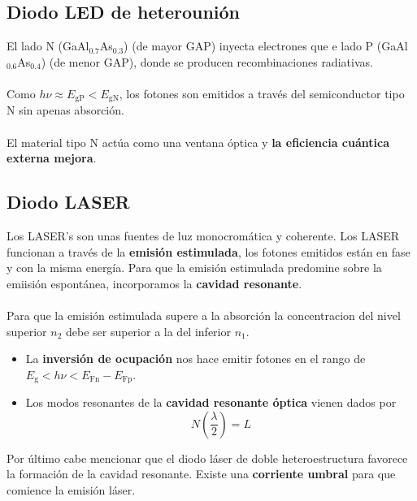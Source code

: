\subsection{Diodo LED de heterounión}
El lado N (GaAl$_{0.7}$As$_{0.3}$) (de mayor GAP) inyecta electrones que e lado P (GaAl$_{0.6}$As$_{0.4}$) (de menor GAP), donde se producen recombinaciones radiativas.\\\\
Como $h\nu \approx E_\mathrm{gP}<E_\mathrm{gN}$, los fotones son emitidos a través del semiconductor tipo N sin apenas absorción.\\\\
El material tipo N actúa como una ventana óptica y \textbf{la eficiencia cuántica externa mejora}.
\subsection{Diodo LASER}
Los LASER's son unas fuentes de luz monocromática y coherente. Los LASER funcionan a través de la \textbf{emisión estimulada}, los fotones emitidos están en fase y con la misma energía. Para que la emisión estimulada predomine sobre la emiisión espontánea, incorporamos la \textbf{cavidad resonante}.\\\\ Para que la emisión estimulada supere a la absorción la concentracion del nivel superior $n_2$ debe ser superior a la del inferior $n_1$.
\begin{itemize}
    \item La \textbf{inversión de ocupación} nos hace emitir fotones en el rango de $E_\mathrm{g}<h\nu<E_\mathrm{Fn}-E_\mathrm{Fp}$.
    \item Los modos resonantes de la \textbf{cavidad resonante óptica} vienen dados por \begin{equation}
        N \left(\frac{\lambda}{2} \right)=L
    \end{equation}
\end{itemize}
Por último cabe mencionar que el diodo láser de doble heteroestructura favorece la formación de la cavidad resonante. Existe una \textbf{corriente umbral} para que comience la emisión láser.